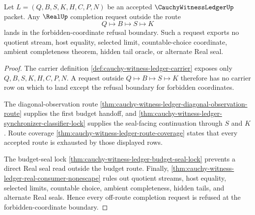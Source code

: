 \begin{theorem}
\label{thm:cauchy-witness-ledger-real-seal-refusal-boundary}
Let $L=(Q,B,S,K,H,C,P,N)$ be an accepted
$\CauchyWitnessLedgerUp$ packet. Any $\RealUp$ completion request outside the
route
$$
Q \longmapsto B \longmapsto S \longmapsto K
$$
lands in the forbidden-coordinate refusal boundary. Such a request exports no
quotient stream, host equality, selected limit, countable-choice coordinate,
ambient completeness theorem, hidden tail oracle, or alternate Real seal.
\end{theorem}
\begin{proof}
The carrier definition \autoref{def:cauchy-witness-ledger-carrier} exposes
only $Q,B,S,K,H,C,P,N$. A request outside
$Q \longmapsto B \longmapsto S \longmapsto K$ therefore has no carrier row on
which to land except the refusal boundary for forbidden coordinates.

The diagonal-observation route
\autoref{thm:cauchy-witness-ledger-diagonal-observation-route} supplies the
first budget handoff, and
\autoref{thm:cauchy-witness-ledger-synchronizer-classifier-lock} supplies the
seal-facing continuation through $S$ and $K$. Route coverage
\autoref{thm:cauchy-witness-ledger-route-coverage} states that every accepted
route is exhausted by those displayed rows.

The budget-seal lock \autoref{thm:cauchy-witness-ledger-budget-seal-lock}
prevents a direct Real seal read outside the budget route. Finally,
\autoref{thm:cauchy-witness-ledger-real-consumer-nonescape} rules out
quotient streams, host equality, selected limits, countable choice, ambient
completeness, hidden tails, and alternate Real seals. Hence every off-route
completion request is refused at the forbidden-coordinate boundary.
\end{proof}

